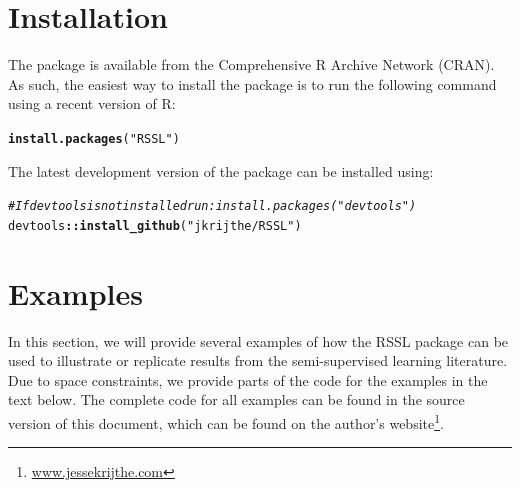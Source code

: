 \documentclass[twoside]{memoir}\usepackage[]{graphicx}\usepackage{xcolor}
\makeatletter
\newcommand{\hlstr}[1]{\textcolor[rgb]{0,0,0}{#1}}%
\newcommand{\hlcom}[1]{\textcolor[rgb]{0.4,0.4,0.4}{\textit{#1}}}%
\newcommand{\hlopt}[1]{\textcolor[rgb]{0,0,0}{\textbf{#1}}}%
\newcommand{\hlstd}[1]{\textcolor[rgb]{0,0,0}{#1}}%
\newcommand{\hlkwd}[1]{\textcolor[rgb]{0,0,0}{\textbf{#1}}}%
\newenvironment{kframe}{%
 \def\at@end@of@kframe{}%
 \ifinner\ifhmode%
  \def\at@end@of@kframe{\end{minipage}}%
  \begin{minipage}{\columnwidth}%
 \fi\fi%
 \def\FrameCommand##1{\hskip\@totalleftmargin \hskip-\fboxsep
 \colorbox{shadecolor}{##1}\hskip-\fboxsep
     \hskip-\linewidth \hskip-\@totalleftmargin \hskip\columnwidth}%
 \MakeFramed {\advance\hsize-\width
   \@totalleftmargin\z@ \linewidth\hsize
   \@setminipage}}%
 {\par\unskip\endMakeFramed%
 \at@end@of@kframe}
\newenvironment{knitrout}{}{} %
\makeatother
\begin{document}
\section{Installation}
The package is available from the Comprehensive R Archive Network (CRAN). As such, the easiest way to install the package is to run the following command using a recent version of R:
\begin{knitrout}
\color{fgcolor}\begin{kframe}
\begin{alltt}
\hlkwd{install.packages}\hlstd{(}\hlstr{"RSSL"}\hlstd{)}
\end{alltt}
\end{kframe}
\end{knitrout}
\noindent The latest development version of the package can be installed using:
\begin{knitrout}
\color{fgcolor}\begin{kframe}
\begin{alltt}
\hlcom{# If devtools is not installed run: install.packages("devtools")}
\hlstd{devtools}\hlopt{::}\hlkwd{install_github}\hlstd{(}\hlstr{"jkrijthe/RSSL"}\hlstd{)}
\end{alltt}
\end{kframe}
\end{knitrout}

\section{Examples}
In this section, we will provide several examples of how the RSSL package can be used to illustrate or replicate results from the semi-supervised learning literature. Due to space constraints, we provide parts of the code for the examples in the text below. The complete code for all examples can be found in the source version of this document, which can be found on the author's website\footnote{\url{www.jessekrijthe.com}}.
\end{document}
